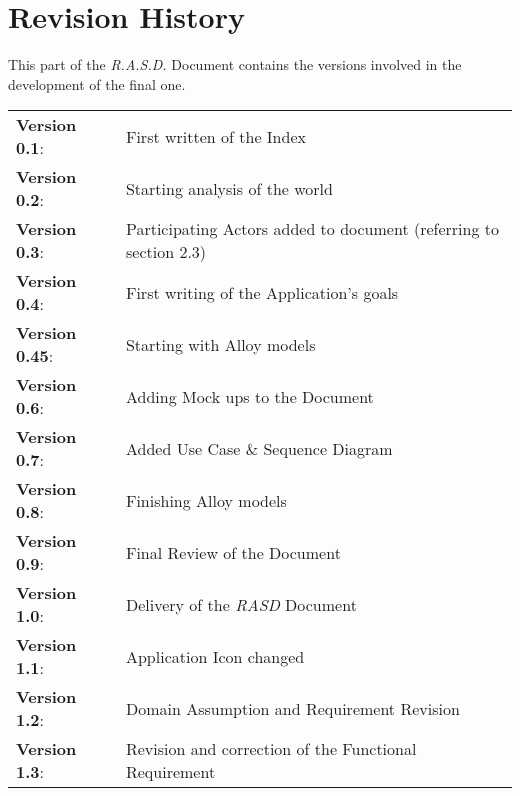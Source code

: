 \section{Revision History}

This part of the \emph{R.A.S.D.} Document contains the versions involved in the development of the final one.

\vspace{10pt}

\begin{tabular}{l l}

	\textbf{Version 0.1}:           & First written of the Index \\
    
    \textbf{Version 0.2}:           & Starting analysis of the world \\

	\textbf{Version 0.3}:           & Participating Actors added to document (referring to section 2.3)\\
    
    \textbf{Version 0.4}:           & First writing of the Application's goals\\
    
    \textbf{Version 0.45}:          & Starting with Alloy models \\
    
    \textbf{Version 0.6}:           & Adding Mock ups to the Document \\
    
    \textbf{Version 0.7}:           & Added Use Case \& Sequence Diagram \\
    
    \textbf{Version 0.8}:           & Finishing Alloy models\\
    
    \textbf{Version 0.9}:           & Final Review of the Document \\
    
    \large{\textbf{Version 1.0}}:   & Delivery of the \emph{RASD} Document \\
    
    \textbf{Version 1.1}:           & Application Icon changed \\

    \textbf{Version 1.2}:           & Domain Assumption and Requirement Revision \\
    
    \textbf{Version 1.3}:           & Revision and correction of the Functional Requirement \\

\end{tabular}